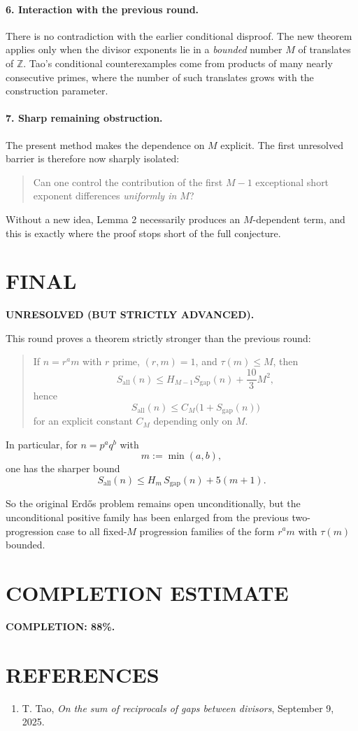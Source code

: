 \paragraph{6. Interaction with the previous round.}
There is no contradiction with the earlier conditional disproof. The new theorem applies only when the divisor exponents lie in a \emph{bounded} number \(M\) of translates of \(\mathbb Z\). Tao's conditional counterexamples come from products of many nearly consecutive primes, where the number of such translates grows with the construction parameter.

\paragraph{7. Sharp remaining obstruction.}
The present method makes the dependence on \(M\) explicit. The first unresolved barrier is therefore now sharply isolated:

\begin{quote}
Can one control the contribution of the first \(M-1\) exceptional short exponent differences \emph{uniformly in \(M\)}?
\end{quote}

Without a new idea, Lemma 2 necessarily produces an \(M\)-dependent term, and this is exactly where the proof stops short of the full conjecture.

\section{FINAL}

\textbf{UNRESOLVED (BUT STRICTLY ADVANCED).}

This round proves a theorem strictly stronger than the previous round:

\begin{quote}
If \(n=r^a m\) with \(r\) prime, \((r,m)=1\), and \(\tau(m)\leq M\), then
\[
S_{\mathrm{all}}(n)\leq H_{M-1}S_{\mathrm{gap}}(n)+\frac{10}{3}M^2,
\]
hence
\[
S_{\mathrm{all}}(n)\leq C_M\bigl(1+S_{\mathrm{gap}}(n)\bigr)
\]
for an explicit constant \(C_M\) depending only on \(M\).
\end{quote}

In particular, for \(n=p^a q^b\) with
\[
m:=\min(a,b),
\]
one has the sharper bound
\[
S_{\mathrm{all}}(n)\leq H_m\,S_{\mathrm{gap}}(n)+5(m+1).
\]

So the original Erd\H{o}s problem remains open unconditionally, but the unconditional positive family has been enlarged from the previous two-progression case to all fixed-\(M\) progression families of the form \(r^a m\) with \(\tau(m)\) bounded.

\section{COMPLETION ESTIMATE}

\noindent \textbf{COMPLETION: 88\%.}

\section{REFERENCES}

\begin{enumerate}
\item T. Tao, \emph{On the sum of reciprocals of gaps between divisors}, September 9, 2025.
\end{enumerate}
